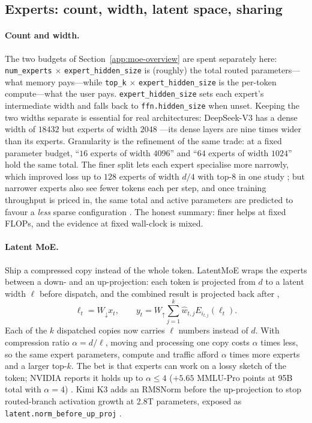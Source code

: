 \subsection{Experts: count, width, latent space, sharing}
\label{app:moe-experts}

\paragraph{Count and width.}
The two budgets of Section~\ref{app:moe-overview} are spent separately here:
\texttt{num\_experts} $\times$ \texttt{expert\_hidden\_size} is (roughly) the
total routed parameters---what memory pays---while \texttt{top\_k} $\times$
\texttt{expert\_hidden\_size} is the per-token compute---what the user pays.
\texttt{expert\_hidden\_size} sets each expert's intermediate width and falls
back to \texttt{ffn.hidden\_size} when unset. Keeping the two widths separate
is essential for real architectures: DeepSeek-V3 has a dense width of
$18432$ but experts of width $2048$ \citep{deepseek2024v3}---its dense layers
are nine times wider than its experts. Granularity is the refinement of the
same trade: at a fixed parameter budget, ``$16$ experts of width $4096$''
and ``$64$ experts of width $1024$'' hold the same total. The finer split
lets each expert specialise more narrowly, which improved loss up to $128$
experts of width $d/4$ with top-$8$ in one study \citep{liew2026principled};
but narrower experts also see fewer tokens each per step, and once training
throughput is priced in, the same total and active parameters are predicted
to favour a \emph{less} sparse configuration \citep{krajewski2025scaling}.
The honest summary: finer helps at fixed FLOPs, and the evidence at fixed
wall-clock is mixed.

\paragraph{Latent MoE.}
Ship a compressed copy instead of the whole token. LatentMoE wraps the
experts between a down- and an up-projection: each token is projected from
$d$ to a latent width $\ell$ before dispatch, and the combined result is
projected back after \citep{elango2026latentmoe},
\begin{equation}
  \ell_t = W_\downarrow x_t,\qquad
  y_t = W_\uparrow \sum_{j=1}^{k} \hat w_{t,j} E_{i_{t,j}}(\ell_t).
  \label{eq:latent}
\end{equation}
Each of the $k$ dispatched copies now carries $\ell$ numbers instead of $d$.
With compression ratio $\alpha = d/\ell$, moving and processing one copy
costs $\alpha$ times less, so the same expert parameters, compute and
traffic afford $\alpha$ times more experts and a larger top-$k$. The bet is
that experts can work on a lossy sketch of the token; NVIDIA reports it
holds up to $\alpha \leqslant 4$ ($+5.65$ MMLU-Pro points at 95B total with
$\alpha = 4$) \citep{elango2026latentmoe}. Kimi K3 adds an RMSNorm before
the up-projection to stop routed-branch activation growth at 2.8T
parameters, exposed as \texttt{latent.norm\_before\_up\_proj}
\citep{kimiteam2026k3}.

